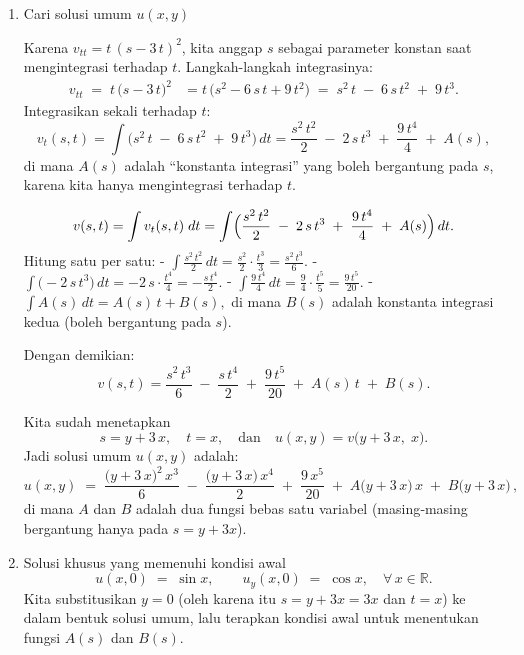 \documentclass[a4paper]{article}
\theoremstyle{definition}
\begin{document}
\begin{enumerate}
\begin{enumerate}
\item Cari solusi umum \(u(x,y)\)

Karena \(v_{tt} = t\,(s - 3\,t)^{2}\), kita anggap \(s\) sebagai parameter konstan saat mengintegrasi terhadap \(t\). Langkah-langkah integrasinya:
   \[
   \begin{aligned}
   v_{tt} \;=\; t\,\bigl(s - 3\,t\bigr)^{2} 
   &= t\,\bigl(s^{2} - 6\,s\,t + 9\,t^{2}\bigr)
   \;=\; s^{2}\,t \;-\; 6\,s\,t^{2} \;+\; 9\,t^{3}.
   \end{aligned}
   \]
   Integrasikan sekali terhadap \(t\):
   \[
   v_{t}(s,t) 
   = \int \bigl(s^{2}\,t \;-\; 6\,s\,t^{2} \;+\; 9\,t^{3}\bigr)\,dt 
   = \frac{s^{2}\,t^{2}}{2} \;-\; 2\,s\,t^{3} \;+\; \frac{9\,t^{4}}{4} \;+\; A(s),
   \]
   di mana \(A(s)\) adalah “konstanta integrasi” yang boleh bergantung pada \(s\), karena kita hanya mengintegrasi terhadap \(t\).


   \[
   v(s,t) 
   = \int v_{t}(s,t)\;dt 
   = \int \Bigl(\frac{s^{2}\,t^{2}}{2} \;-\; 2\,s\,t^{3} \;+\; \frac{9\,t^{4}}{4} \;+\; A(s)\Bigr)\,dt.
   \]
   Hitung satu per satu:
   - \(\displaystyle \int \frac{s^{2}\,t^{2}}{2}\,dt 
   = \frac{s^{2}}{2} \cdot \frac{t^{3}}{3} 
   = \frac{s^{2}\,t^{3}}{6}.\)
   - \(\displaystyle \int \bigl(-2\,s\,t^{3}\bigr)\,dt 
   = -2\,s \cdot \frac{t^{4}}{4} 
   = -\frac{s\,t^{4}}{2}.\)
   - \(\displaystyle \int \frac{9\,t^{4}}{4}\,dt 
   = \frac{9}{4} \cdot \frac{t^{5}}{5} 
   = \frac{9\,t^{5}}{20}.\)
   - \(\displaystyle \int A(s)\,dt = A(s)\,t + B(s),\)  
     di mana \(B(s)\) adalah konstanta integrasi kedua (boleh bergantung pada \(s\)).

   Dengan demikian:
   \[
   v(s,t) 
   = \frac{s^{2}\,t^{3}}{6} \;-\; \frac{s\,t^{4}}{2} \;+\; \frac{9\,t^{5}}{20} \;+\; A(s)\,t \;+\; B(s).
   \]

   Kita sudah menetapkan
   \[
   s = y + 3\,x,\quad t = x,
   \quad\text{dan}\quad
   u(x,y) = v\bigl(y + 3\,x,\;x\bigr).
   \]
   Jadi solusi umum \(u(x,y)\) adalah:
   \[
   \boxed{
   u(x,y) 
   \;=\; 
   \frac{\bigl(y + 3\,x\bigr)^{2}\,x^{3}}{6}
   \;-\; \frac{\bigl(y + 3\,x\bigr)\,x^{4}}{2}
   \;+\; \frac{9\,x^{5}}{20}
   \;+\; A\bigl(y + 3\,x\bigr)\,x
   \;+\; B\bigl(y + 3\,x\bigr)\,,
   }
   \]
   di mana \(A\) dan \(B\) adalah dua fungsi bebas satu variabel (masing‐masing bergantung hanya pada \(s = y+3x\)).


\item Solusi khusus yang memenuhi kondisi awal
\[
u(x,0) \;=\; \sin x,\qquad u_{y}(x,0) \;=\; \cos x,\quad \forall\,x\in\mathbb{R}.
\]
Kita substitusikan \(y=0\) (oleh karena itu \(s = y + 3x = 3x\) dan \(t = x\)) ke dalam bentuk solusi umum, lalu terapkan kondisi awal untuk menentukan fungsi \(A(s)\) dan \(B(s)\).


\end{enumerate}
\end{enumerate}
\end{document}
